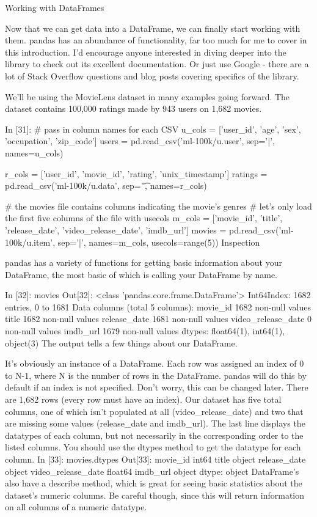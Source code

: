 
Working with DataFrames

Now that we can get data into a DataFrame, we can finally start working with them. pandas has an abundance of functionality, far too much for me to cover in this introduction. I'd encourage anyone interested in diving deeper into the library to check out its excellent documentation. Or just use Google - there are a lot of Stack Overflow questions and blog posts covering specifics of the library.

We'll be using the MovieLens dataset in many examples going forward. The dataset contains 100,000 ratings made by 943 users on 1,682 movies.

In [31]:
# pass in column names for each CSV
u_cols = ['user_id', 'age', 'sex', 'occupation', 'zip_code']
users = pd.read_csv('ml-100k/u.user', sep='|', names=u_cols)

r_cols = ['user_id', 'movie_id', 'rating', 'unix_timestamp']
ratings = pd.read_csv('ml-100k/u.data', sep='\t', names=r_cols)

# the movies file contains columns indicating the movie's genres
# let's only load the first five columns of the file with usecols
m_cols = ['movie_id', 'title', 'release_date', 'video_release_date', 'imdb_url']
movies = pd.read_csv('ml-100k/u.item', sep='|', names=m_cols, usecols=range(5))
Inspection

pandas has a variety of functions for getting basic information about your DataFrame, the most basic of which is calling your DataFrame by name.

In [32]:
movies
Out[32]:
<class 'pandas.core.frame.DataFrame'>
Int64Index: 1682 entries, 0 to 1681
Data columns (total 5 columns):
movie_id              1682  non-null values
title                 1682  non-null values
release_date          1681  non-null values
video_release_date    0  non-null values
imdb_url              1679  non-null values
dtypes: float64(1), int64(1), object(3)
The output tells a few things about our DataFrame.

It's obviously an instance of a DataFrame.
Each row was assigned an index of 0 to N-1, where N is the number of rows in the DataFrame. pandas will do this by default if an index is not specified. Don't worry, this can be changed later.
There are 1,682 rows (every row must have an index).
Our dataset has five total columns, one of which isn't populated at all (video_release_date) and two that are missing some values (release_date and imdb_url).
The last line displays the datatypes of each column, but not necessarily in the corresponding order to the listed columns. You should use the dtypes method to get the datatype for each column.
In [33]:
movies.dtypes
Out[33]:
movie_id                int64
title                  object
release_date           object
video_release_date    float64
imdb_url               object
dtype: object
DataFrame's also have a describe method, which is great for seeing basic statistics about the dataset's numeric columns. Be careful though, since this will return information on all columns of a numeric datatype.

